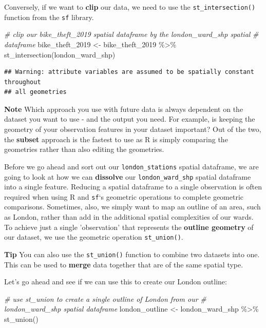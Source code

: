 \documentclass[
]{book}
\newenvironment{Shaded}{\begin{snugshade}}{\end{snugshade}}
\newcommand{\CommentTok}[1]{\textcolor[rgb]{0.56,0.35,0.01}{\textit{#1}}}
\newcommand{\FunctionTok}[1]{\textcolor[rgb]{0.00,0.00,0.00}{#1}}
\newcommand{\NormalTok}[1]{#1}
\newcommand{\OtherTok}[1]{\textcolor[rgb]{0.56,0.35,0.01}{#1}}
\newcommand{\SpecialCharTok}[1]{\textcolor[rgb]{0.00,0.00,0.00}{#1}}
\begin{document}
Conversely, if we want to \textbf{clip} our data, we need to use the \texttt{st\_intersection()} function from the \texttt{sf} library.

\begin{Shaded}
\begin{Highlighting}[]
\CommentTok{\# clip our bike\_theft\_2019 spatial dataframe by the london\_ward\_shp spatial}
\CommentTok{\# dataframe}
\NormalTok{bike\_theft\_2019 }\OtherTok{\textless{}{-}}\NormalTok{ bike\_theft\_2019 }\SpecialCharTok{\%\textgreater{}\%}
    \FunctionTok{st\_intersection}\NormalTok{(london\_ward\_shp)}
\end{Highlighting}
\end{Shaded}

\begin{verbatim}
## Warning: attribute variables are assumed to be spatially constant throughout
## all geometries
\end{verbatim}

\textbf{Note}
Which approach you use with future data is always dependent on the dataset you want to use - and the output you need. For example, is keeping the geometry of your observation features in your dataset important? Out of the two, the \textbf{subset} approach is the fastest to use as R is simply comparing the geometries rather than also editing the geometries.

Before we go ahead and sort out our \texttt{london\_stations} spatial dataframe, we are going to look at how we can \textbf{dissolve} our \texttt{london\_ward\_shp} spatial dataframe into a single feature. Reducing a spatial dataframe to a single observation is often required when using R and \texttt{sf}`s geometric operations to complete geometric comparisons. Sometimes, also, we simply want to map an outline of an area, such as London, rather than add in the additional spatial complexities of our wards. To achieve just a single 'observation' that represents the \textbf{outline geometry} of our dataset, we use the geometric operation \texttt{st\_union()}.

\textbf{Tip}
You can also use the \texttt{st\_union()} function to combine two datasets into one. This can be used to \textbf{merge} data together that are of the same spatial type.

Let's go ahead and see if we can use this to create our London outline:

\begin{Shaded}
\begin{Highlighting}[]
\CommentTok{\# use st\_union to create a single outline of London from our}
\CommentTok{\# london\_ward\_shp spatial dataframe}
\NormalTok{london\_outline }\OtherTok{\textless{}{-}}\NormalTok{ london\_ward\_shp }\SpecialCharTok{\%\textgreater{}\%}
    \FunctionTok{st\_union}\NormalTok{()}
\end{Highlighting}
\end{Shaded}
\end{document}
